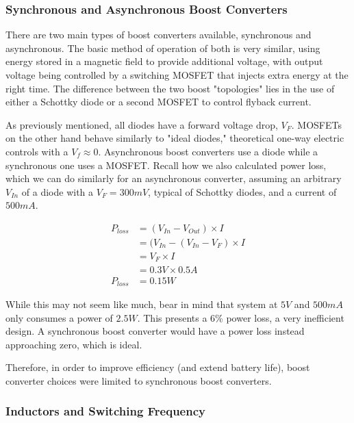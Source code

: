 \documentclass[11pt]{article}
\begin{document}
\subsubsection{Synchronous and Asynchronous Boost Converters}

There are two main types of boost converters available, synchronous and asynchronous. The basic method of operation of both is very similar, using energy stored in a magnetic field to provide additional voltage, with output voltage being controlled by a switching MOSFET that injects extra energy at the right time. The difference between the two boost "topologies" lies in the use of either a Schottky diode or a second MOSFET to control flyback current. 

As previously mentioned, all diodes have a forward voltage drop, \(V_F\). MOSFETs on the other hand behave similarly to "ideal diodes," theoretical one-way electric controls with a \(V_f \approx 0\). Asynchronous boost converters use a diode while a synchronous one uses a MOSFET. Recall how we also calculated power loss, which we can do similarly for an asynchronous converter, assuming an arbitrary \(V_{In}\) of a diode with a \(V_F = 300mV\), typical of Schottky diodes, and a current of \(500mA\).

\begin{equation}
\begin{aligned}
	P_{loss} &= (V_{In} - V_{Out}) \times I \\
	&= (V_{In} - (V_{In} - V_F) \times I \\
	&= V_F \times I \\
	&= 0.3V \times 0.5A \\
	P_{loss} &= 0.15W
\end{aligned}	
\end{equation}

While this may not seem like much, bear in mind that system at \(5V\) and \(500mA\) only consumes a power of \(2.5W\). This presents a 6\% power loss, a very inefficient design. A synchronous boost converter would have a power loss instead approaching zero, which is ideal. 

Therefore, in order to improve efficiency (and extend battery life), boost converter choices were limited to synchronous boost converters.

\subsubsection{Inductors and Switching Frequency}
\end{document}
